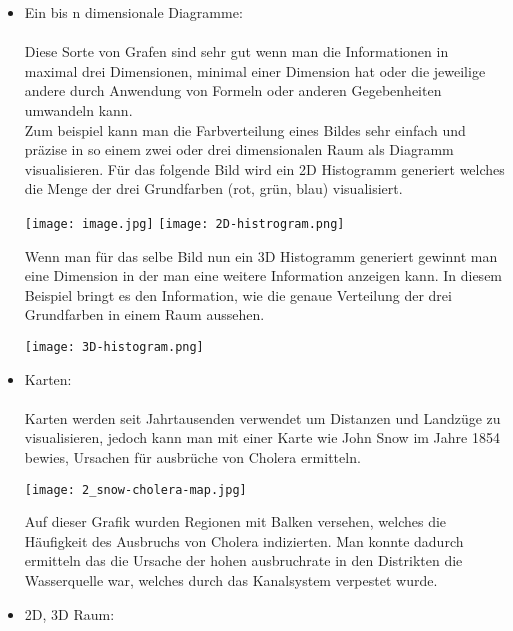 \begin{itemize}
\begin{itemize}
        \end{itemize}
    \newpage
    \item{Ein bis n dimensionale Diagramme:} \\ \\
        Diese Sorte von Grafen sind sehr gut wenn man die Informationen in maximal drei Dimensionen, minimal einer Dimension hat oder die
        jeweilige andere durch Anwendung von Formeln oder anderen Gegebenheiten umwandeln kann. \\
        Zum beispiel kann man die Farbverteilung eines Bildes sehr einfach und präzise in so einem zwei oder drei dimensionalen Raum als
        Diagramm visualisieren.
        Für das folgende Bild wird ein 2D Histogramm generiert welches die Menge der drei Grundfarben (rot, grün, blau) visualisiert.
        \begin{center}
            \texttt{[image: image.jpg]}
            \texttt{[image: 2D-histrogram.png]}
        \end{center}
        \newpage \noindent
        Wenn man für das selbe Bild nun ein 3D Histogramm generiert gewinnt man eine Dimension in der man eine weitere Information anzeigen
        kann. In diesem Beispiel bringt es den Information, wie die genaue Verteilung der drei Grundfarben in einem Raum aussehen.
        \begin{center}
            \texttt{[image: 3D-histogram.png]}
        \end{center}
        \newpage \noindent
    \item{Karten:} \\ \\
        Karten werden seit Jahrtausenden verwendet um Distanzen und Landzüge zu visualisieren, jedoch kann man mit einer Karte wie John Snow
        im Jahre 1854 bewies, Ursachen für ausbrüche von Cholera ermitteln.\cite{bestvisualizations}
        \begin{center}
            \texttt{[image: 2\_snow-cholera-map.jpg]}\cite{choleramap}
        \end{center}
        Auf dieser Grafik wurden Regionen mit Balken versehen, welches die Häufigkeit des Ausbruchs von Cholera indizierten. Man
        konnte dadurch ermitteln das die Ursache der hohen ausbruchrate in den Distrikten die Wasserquelle war, welches durch das
        Kanalsystem verpestet wurde.\cite{bestvisualizations}
        \newpage \noindent
    \item{2D, 3D Raum:} \\ \\

\end{itemize}
